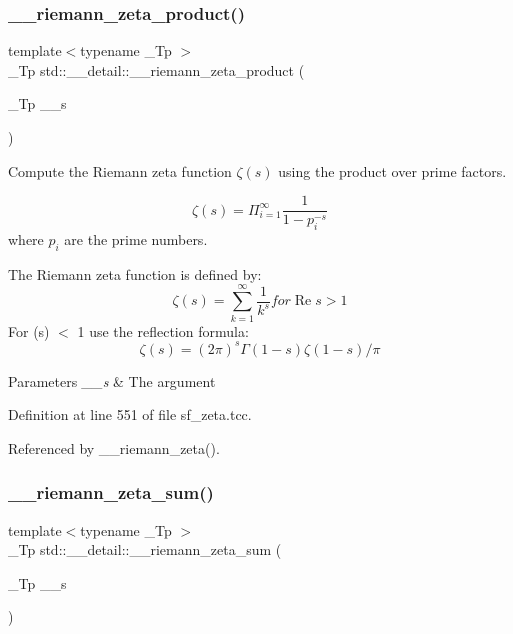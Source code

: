 \subsubsection{\texorpdfstring{\+\_\+\+\_\+riemann\+\_\+zeta\+\_\+product()}{\_\_riemann\_zeta\_product()}}
{\footnotesize\ttfamily template$<$typename \+\_\+\+Tp $>$ \\
\+\_\+\+Tp std\+::\+\_\+\+\_\+detail\+::\+\_\+\+\_\+riemann\+\_\+zeta\+\_\+product (\begin{DoxyParamCaption}\item[{\+\_\+\+Tp}]{\+\_\+\+\_\+s }\end{DoxyParamCaption})}



Compute the Riemann zeta function $ \zeta(s) $ using the product over prime factors. 

\[ \zeta(s) = \Pi_{i=1}^\infty \frac{1}{1 - p_i^{-s}} \] where $ {p_i} $ are the prime numbers.

The Riemann zeta function is defined by\+: \[ \renewcommand\Re{\operatorname{Re}} \renewcommand\Im{\operatorname{Im}} \zeta(s) = \sum_{k=1}^{\infty} \frac{1}{k^{s}} for \Re{s} > 1 \] For (s) $<$ 1 use the reflection formula\+: \[ \zeta(s) = (2\pi)^s \Gamma(1-s) \zeta(1-s) / \pi \]


\begin{DoxyParams}{Parameters}
{\em \+\_\+\+\_\+s} & The argument \\
\hline
\end{DoxyParams}


Definition at line 551 of file sf\+\_\+zeta.\+tcc.



Referenced by \+\_\+\+\_\+riemann\+\_\+zeta().

\mbox{\label{namespacestd_1_1____detail_a417dc216465f02bb7ef055fa0e4e1f0b}} 
\subsubsection{\texorpdfstring{\+\_\+\+\_\+riemann\+\_\+zeta\+\_\+sum()}{\_\_riemann\_zeta\_sum()}}
{\footnotesize\ttfamily template$<$typename \+\_\+\+Tp $>$ \\
\+\_\+\+Tp std\+::\+\_\+\+\_\+detail\+::\+\_\+\+\_\+riemann\+\_\+zeta\+\_\+sum (\begin{DoxyParamCaption}\item[{\+\_\+\+Tp}]{\+\_\+\+\_\+s }\end{DoxyParamCaption})}



